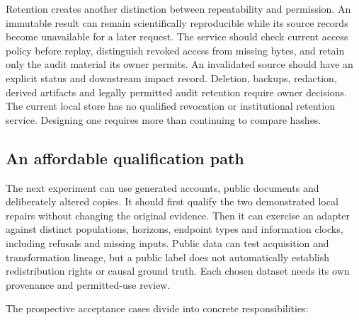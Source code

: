 Retention creates another distinction between repeatability and
permission. An immutable result can remain scientifically reproducible
while its source records become unavailable for a later request. The
service should check current access policy before replay, distinguish
revoked access from missing bytes, and retain only the audit material
its owner permits. An invalidated source should have an explicit status
and downstream impact record. Deletion, backups, redaction, derived
artifacts and legally permitted audit retention require owner decisions.
The current local store has no qualified revocation or institutional
retention service. Designing one requires more than continuing to
compare hashes.~\citep{exec14_custody_design}

\hypertarget{an-affordable-qualification-path}{%
\subsection{An affordable qualification
path}\label{an-affordable-qualification-path}}

The next experiment can use generated accounts, public documents and
deliberately altered copies. It should first qualify the two
demonstrated local repairs without changing the original evidence. Then
it can exercise an adapter against distinct populations, horizons,
endpoint types and information clocks, including refusals and missing
inputs. Public data can test acquisition and transformation lineage, but
a public label does not automatically establish redistribution rights or
causal ground truth. Each chosen dataset needs its own provenance and
permitted-use review.

The prospective acceptance cases divide into concrete responsibilities:

